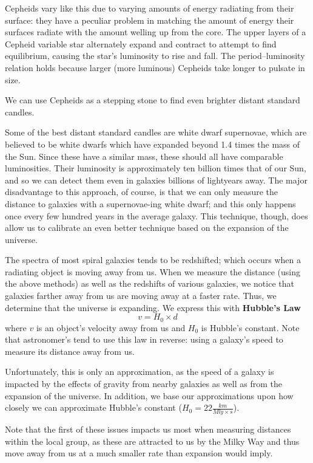 Cepheids vary like this due to varying amounts of energy radiating from their surface: they have a peculiar problem in matching the amount of energy their surfaces radiate with the amount welling up from the core. The upper layers of a Cepheid variable star alternately expand and contract to attempt to find equilibrium, causing the star’s luminosity to rise and fall. The period–luminosity relation holds because larger (more luminous) Cepheids take longer to pulsate in size.

We can use Cepheids as a stepping stone to find even brighter distant standard candles.

Some of the best distant standard candles are white dwarf supernovae, which are believed to be white dwarfs which have expanded beyond 1.4 times the mass of the Sun. Since these have a similar mass, these should all have comparable luminosities. Their luminosity is approximately ten billion times that of our Sun, and so we can detect them even in galaxies billions of lightyears away. The major disadvantage to this approach, of course, is that we can only measure the distance to galaxies with a supernovae-ing white dwarf; and this only happens once every few hundred years in the average galaxy. This technique, though, does allow us to calibrate an even better technique based on the expansion of the universe.

The spectra of most spiral galaxies tends to be redshifted; which occurs when a radiating object is moving away from us. When we measure the distance (using the above methods) as well as the redshifts of various galaxies, we notice that galaxies farther away from us are moving away at a faster rate. Thus, we determine that the universe is expanding. We express this with {\bf Hubble's Law} \[ v = H_0 \times d \] where $v$ is an object's velocity away from us and $H_0$ is Hubble's constant. Note that astronomer's tend to use this law in reverse: using a galaxy's speed to measure its distance away from us.

Unfortunately, this is only an approximation, as the speed of a galaxy is impacted by the effects of gravity from nearby galaxies as well as from the expansion of the universe. In addition, we base our approximations upon how closely we can approximate Hubble's constant ($H_0 = 22 \frac{km}{Mly \times s}$).

Note that the first of these issues impacts us most when measuring distances within the local group, as these are attracted to us by the Milky Way and thus move away from us at a much smaller rate than expansion would imply.

